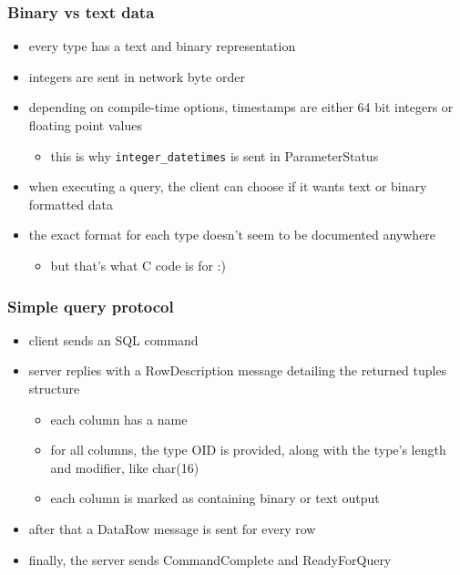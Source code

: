 \documentclass{beamer}
\begin{document}
\begin{frame}
  \frametitle{Binary vs text data}

  \begin{itemize}
  \item every type has a text and binary representation
  \item integers are sent in network byte order
  \item depending on compile-time options, timestamps are either 64 bit
    integers or floating point values
    \begin{itemize}
    \item this is why \texttt{integer\_datetimes} is sent in ParameterStatus
    \end{itemize}
  \item when executing a query, the client can choose if it wants text or
    binary formatted data
  \item the exact format for each type doesn't seem to be documented anywhere
    \begin{itemize}
    \item but that's what C code is for :)
    \end{itemize}
  \end{itemize}
\end{frame}

\begin{frame}
  \frametitle{Simple query protocol}

  \begin{itemize}
  \item client sends an SQL command
  \item server replies with a RowDescription message detailing the returned
    tuples structure
    \begin{itemize}
    \item each column has a name
    \item for all columns, the type OID is provided, along with the type's
      length and modifier, like char(16)
    \item each column is marked as containing binary or text output
    \end{itemize}
  \item after that a DataRow message is sent for every row
  \item finally, the server sends CommandComplete and ReadyForQuery
  \end{itemize}
\end{frame}
\end{document}
